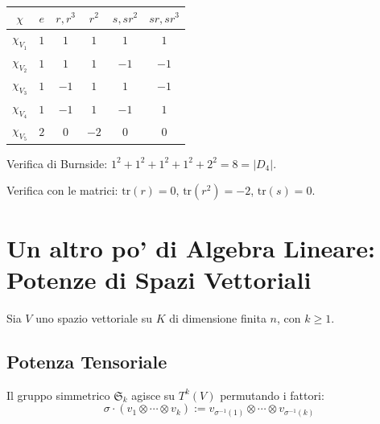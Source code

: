 {  \begin{center}
    \begin{tabular}{|c|c|c|c|c|c|}
      \hline
      $ \chi $ & $ e $ & $ r, r^3 $ & $ r^2 $ & $ s, sr^2 $ & $ sr, sr^3 $ \\
      \hline
      $ \chi_{V_1} $ & $ 1 $ & $ 1 $ & $ 1 $ & $ 1 $ & $ 1 $ \\
      $ \chi_{V_2} $ & $ 1 $ & $ 1 $ & $ 1 $ & $ -1 $ & $ -1 $ \\
      $ \chi_{V_3} $ & $ 1 $ & $ -1 $ & $ 1 $ & $ 1 $ & $ -1 $ \\
      $ \chi_{V_4} $ & $ 1 $ & $ -1 $ & $ 1 $ & $ -1 $ & $ 1 $ \\
      $ \chi_{V_5} $ & $ 2 $ & $ 0 $ & $ -2 $ & $ 0 $ & $ 0 $ \\
      \hline
    \end{tabular}
  \end{center}

  Verifica di Burnside: $ 1^2 + 1^2 + 1^2 + 1^2 + 2^2 = 8 = |D_4| $. \checkmark

  Verifica con le matrici: $ \mathrm{tr}(r) = 0 $, $ \mathrm{tr}(r^2) = -2 $, $ \mathrm{tr}(s) = 0 $. \checkmark
}

\section{Un altro po' di Algebra Lineare: Potenze di Spazi Vettoriali}

Sia $ V $ uno spazio vettoriale su $ K $ di dimensione finita $ n $, con $ k \geq 1 $.

\subsection{Potenza Tensoriale}


Il gruppo simmetrico $ \mathfrak{S}_k $ agisce su $ T^k(V) $ permutando i fattori:
\[
  \sigma \cdot (v_1 \otimes \cdots \otimes v_k) := v_{\sigma^{-1}(1)} \otimes \cdots \otimes v_{\sigma^{-1}(k)}
\]


